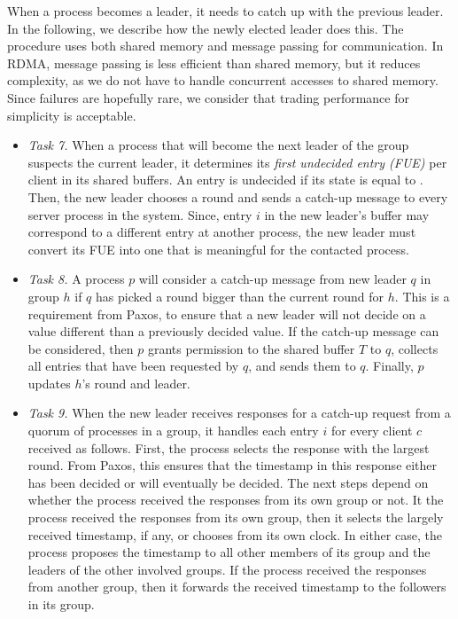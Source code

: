 %

When a process becomes a leader, it needs to catch up with the previous leader.
In the following, we describe how the newly elected leader does this.
The procedure uses both shared memory and message passing for communication.
In RDMA, message passing is less efficient than shared memory, but it reduces complexity, as we do not have to handle concurrent accesses to shared memory.
Since failures are hopefully rare, we consider that trading performance for simplicity is acceptable.

\begin{itemize}
\item \emph{Task 7.} 
When a process that will become the next leader of the group suspects the current leader, it determines its \emph{first undecided entry (FUE)} per client in its shared buffers.
An entry is undecided if its state is equal to \mcast. 
Then, the new leader chooses a round and sends a catch-up message to every server process in the system.
Since, entry $i$ in the new leader's buffer may correspond to a different entry at another process, the new leader must convert its FUE into one that is meaningful for the contacted process.

\item \emph{Task 8.} 
A process $p$ will consider a catch-up message from new leader $q$ in group $h$ if $q$ has picked a round bigger than the current round for $h$. 
This is a requirement from Paxos, to ensure that a new leader will not decide on a value different than a previously decided value.
If the catch-up message can be considered, then $p$ grants permission to the shared buffer $T$ to $q$, collects all entries that have been requested by $q$, and sends them to $q$.
Finally, $p$ updates $h$'s round and leader.

\item \emph{Task 9.}
When the new leader receives responses for a catch-up request from a quorum of processes in a group, it handles each entry $i$ for every client $c$ received as follows.
First, the process selects the response with the largest round. 
From Paxos, this ensures that the timestamp in this response either has been decided or will eventually be decided.
The next steps depend on whether the process received the responses from its own group or not.
It the process received the responses from its own group, then it selects the largely received timestamp, if any, or chooses from its own clock. In either case, the process proposes the timestamp to all other members of its group and the leaders of the other involved groups.
If the process received the responses from another group, then it forwards the received timestamp to the followers in its group.
\end{itemize}

